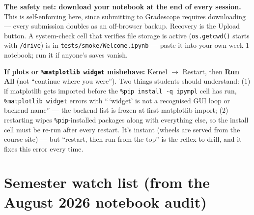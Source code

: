 \documentclass[11pt]{article}
\newcommand{\code}[1]{\texttt{\small #1}}
\begin{document}
\textbf{The safety net: download your notebook at the end of every session.}
This is self-enforcing here, since submitting to Gradescope requires
downloading --- every submission doubles as an off-browser backup. Recovery is
the Upload button. A system-check cell that verifies file storage is active
(\code{os.getcwd()} starts with \code{/drive}) is in
\code{tests/smoke/Welcome.ipynb} --- paste it into your own week-1 notebook;
run it if anyone's saves vanish.

\textbf{If plots or \code{\%matplotlib widget} misbehave:} Kernel
$\rightarrow$ Restart, then \textbf{Run All} (not ``continue where you
were''). Two things students should understand: (1) if matplotlib gets
imported before the \code{\%pip install -q ipympl} cell has run,
\code{\%matplotlib widget} errors with ``\,`widget' is not a recognised GUI
loop or backend name'' --- the backend list is frozen at first matplotlib
import; (2) restarting wipes \code{\%pip}-installed packages along with
everything else, so the install cell must be re-run after every restart. It's
instant (wheels are served from the course site) --- but ``restart, then run
from the top'' is the reflex to drill, and it fixes this error every time.

\section{Semester watch list (from the August 2026 notebook audit)}
\end{document}
